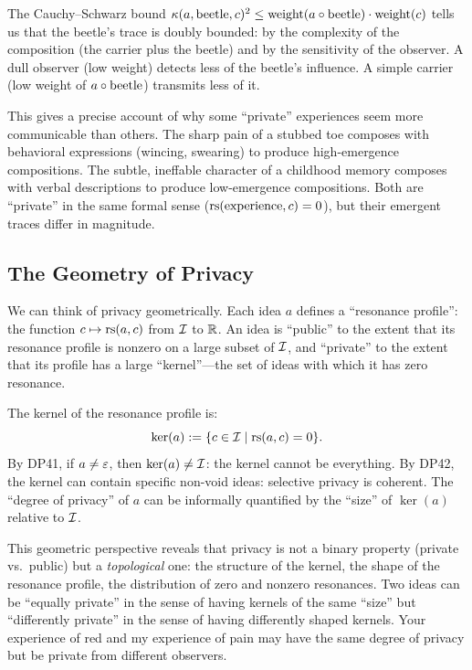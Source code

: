 The Cauchy--Schwarz bound $\kappa(a, \mathrm{beetle}, c)^2 \leq
\mathrm{weight}(a \circ \mathrm{beetle}) \cdot \mathrm{weight}(c)$ tells
us that the beetle's trace is doubly bounded: by the complexity of the
composition (the carrier plus the beetle) and by the sensitivity of the
observer.  A dull observer (low weight) detects less of the beetle's influence.
A simple carrier (low weight of $a \circ \mathrm{beetle}$) transmits less
of it.

This gives a precise account of why some ``private'' experiences seem more
communicable than others.  The sharp pain of a stubbed toe composes with
behavioral expressions (wincing, swearing) to produce high-emergence
compositions.  The subtle, ineffable character of a childhood memory composes
with verbal descriptions to produce low-emergence compositions.  Both are
``private'' in the same formal sense ($\mathrm{rs}(\mathrm{experience}, c) = 0$), but
their emergent traces differ in magnitude.

\subsection{The Geometry of Privacy}

We can think of privacy geometrically.  Each idea $a$ defines a ``resonance
profile'': the function $c \mapsto \mathrm{rs}(a, c)$ from $\mathcal{I}$ to $\mathbb{R}$.  An idea
is ``public'' to the extent that its resonance profile is nonzero on a large
subset of $\mathcal{I}$, and ``private'' to the extent that its profile has a large
``kernel''---the set of ideas with which it has zero resonance.

The kernel of the resonance profile is:
\[
\ker(a) := \{c \in \mathcal{I} \mid \mathrm{rs}(a, c) = 0\}.
\]
By DP41, if $a \neq \varepsilon$, then $\ker(a) \neq \mathcal{I}$: the kernel cannot be
everything.  By DP42, the kernel can contain specific non-void ideas: selective
privacy is coherent.  The ``degree of privacy'' of $a$ can be informally
quantified by the ``size'' of $\ker(a)$ relative to $\mathcal{I}$.

This geometric perspective reveals that privacy is not a binary property
(private vs.\ public) but a \emph{topological} one: the structure of the
kernel, the shape of the resonance profile, the distribution of zero and
nonzero resonances.  Two ideas can be ``equally private'' in the sense of
having kernels of the same ``size'' but ``differently private'' in the sense
of having differently shaped kernels.  Your experience of red and my experience
of pain may have the same degree of privacy but be private from different
observers.

